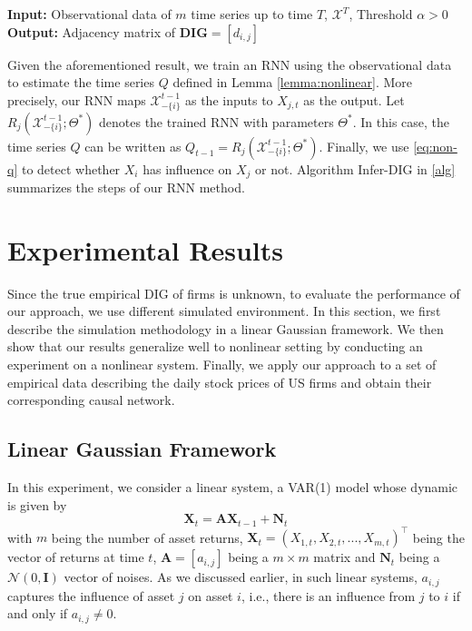  \begin{algorithm}[t]
 \textbf{Input:} Observational data of $m$ time series up to time $T$, $\mathcal{X}^T$, Threshold $\alpha>0$\;
 \textbf{Output:} Adjacency matrix of $\textbf{DIG}=[d_{i,j}]$\;
 \label{alg}
\end{algorithm}
 Given the aforementioned result, we train an RNN using the observational data to estimate the time series $Q$ defined in Lemma \ref{lemma:nonlinear}.
 More precisely, our RNN maps $\mathcal{X}_{-\{i\}}^{t-1}$ as the inputs to $X_{j,t}$ as the output. 
 Let $R_j(\mathcal{X}_{-\{i\}}^{t-1};\Theta^*)$ denotes the trained RNN with parameters $\Theta^*$. 
 In this case, the time series $Q$ can be written as  $Q_{t-1}=R_{j}(\mathcal{X}_{-\{i\}}^{t-1};\Theta^*)$.
 Finally, we use \eqref{eq:non-q} to detect whether $X_i$ has influence on $X_j$ or not. 
 Algorithm Infer-DIG in \ref{alg} summarizes the steps of our RNN method.




 
 
\section{Experimental Results}\label{sec:exp}

 Since the true empirical DIG of firms is unknown, to evaluate the performance of our approach, we use different simulated environment.
 In this section, we first describe the simulation methodology in a linear Gaussian framework. 
 We then show that our results generalize well to nonlinear setting by conducting an experiment on a nonlinear system. 
 Finally, we apply our approach to a set of empirical data describing the daily stock prices of US firms and obtain their corresponding causal network. 
 
 \subsection{Linear Gaussian Framework} \label{linfr}
 In this experiment, we consider a linear system, a VAR(1) model whose dynamic is given by 
\begin{equation}\label{eq:ex_lin}
    \textbf{X}_t = \textbf{A} \textbf{X}_{t-1} + \textbf{N}_t
\end{equation}
with $m$ being the number of asset returns, $\textbf{X}_t = (X_{1,t}, X_{2,t}, ... , X_{m,t})^\top$ being the vector of returns at time $t$, $\textbf{A}=[a_{i,j}]$ being a $m\times m$ matrix and $\textbf{N}_t$ being a $\mathcal{N}(0,\textbf{I})$ vector of noises. 
As we discussed earlier, in such linear systems, $a_{i,j}$ captures the influence of asset $j$ on asset $i$, i.e., there is an influence from $j$ to $i$ if and only if $a_{i,j}\neq0$.

